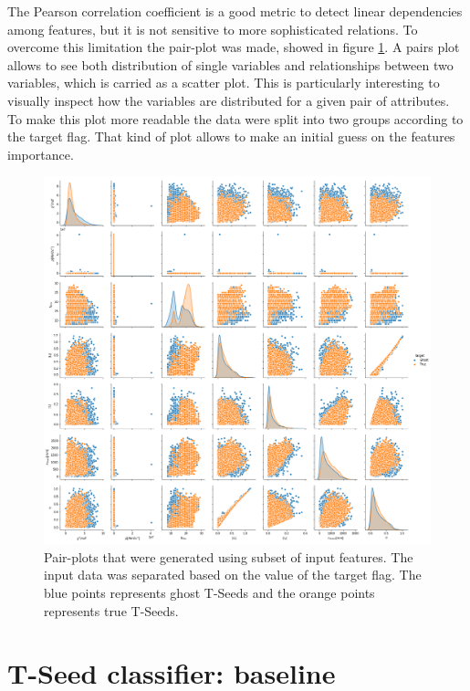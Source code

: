     
The Pearson  correlation coefficient is a good metric to detect linear dependencies among features, but it is not sensitive to more sophisticated relations. To overcome this limitation the pair-plot was made, showed in figure \ref{fig:Pair plot}. A pairs plot allows to see both distribution of single variables and relationships between two variables, which is carried as a scatter plot. This is particularly interesting to visually inspect how the variables are distributed for a given pair of attributes. To make this plot more readable the data were split into two groups according to the target flag. That kind of plot allows to make an initial guess on the features importance. 

\begin{figure}[!h]
\centering
\includegraphics[width=\textwidth]{figures/pair_plot.png}
\caption{Pair-plots that were generated using subset of input features. The input data was separated based on the value of the target flag. The blue points represents ghost T-Seeds and the orange points represents true T-Seeds. }
\label{fig:Pair plot}
\end{figure}

\section{T-Seed classifier: baseline}

